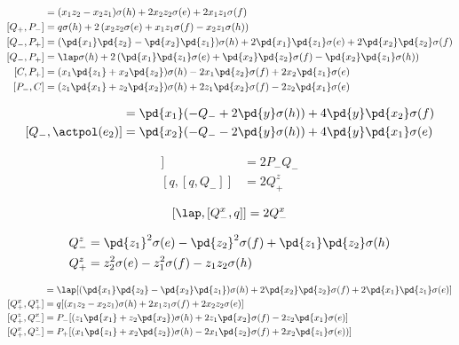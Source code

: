 \begin{align}
[Q_+, P_-] &= (x_1z_2 - x_2z_1)\sigma(h) + 2x_2z_2\sigma(e) + 2x_1z_1\sigma(f)\\
[Q_+, P_-] &= q\sigma(h) + 2\left(x_2z_2\sigma(e) + x_1z_1\sigma(f) -x_2z_1\sigma(h) \right)\\
[Q_-, P_+] &= (\pd{x_1}\pd{z_2} - \pd{x_2}\pd{z_1})\sigma(h) + 2\pd{x_1}\pd{z_1}\sigma(e) + 2\pd{x_2}\pd{z_2}\sigma(f) \\
[Q_-, P_+] &= \lap\sigma(h) + 2\left(\pd{x_1}\pd{z_1}\sigma(e) + \pd{x_2}\pd{z_2}\sigma(f) - \pd{x_2}\pd{z_1} \sigma(h)\right)\\
[C, P_+] &= (x_1\pd{z_1} + x_2 \pd{z_2})\sigma(h) - 2x_1\pd{z_2}\sigma(f) + 2x_2 \pd{z_1} \sigma(e) \\
[P_-, C] &= (z_1\pd{x_1} + z_2 \pd{x_2})\sigma(h) + 2 z_1\pd{x_2}\sigma(f) - 2z_2 \pd{x_1} \sigma(e)
\end{align}

\begin{align}
[Q_-, \actpol(e_1)] & = \pd{x_1}(- Q_- + 2\pd{y}\sigma(h) ) + 4\pd{y}\pd{x_2}\sigma(f) \\
[Q_-, \actpol(e_2)] & = \pd{x_2}( - Q_- -2\pd{y}\sigma(h)) + 4\pd{y}\pd{x_1}\sigma(e)
\end{align}

\begin{align}
 [Q_-, [Q_-, q]] & = 2P_-Q_-\\
 [q, [q, Q_-]] & = 2Q_+^z
\end{align}

\[
 [\lap, [Q_-^x, q]] = 2Q_-^x
\]

\begin{align}
Q_-^z &= \pd{z_1}^2 \sigma(e) - \pd{z_2}^2 \sigma(f) + \pd{z_1}\pd{z_2} \sigma(h) \\
Q_+^z &= z_2^2 \sigma(e) - z_1^2 \sigma(f) - z_1 z_2 \sigma(h)
\end{align}


\begin{align}
[Q_-^x, Q_-^z] & = \lap[(\pd{x_1}\pd{z_2} - \pd{x_2}\pd{z_1}) \sigma(h) + 2\pd{x_2}\pd{z_2}\sigma(f) + 2\pd{x_1}\pd{z_1}\sigma(e)] \\
[Q_+^x, Q_+^z] & = q[(x_1 z_2 - x_2 z_1) \sigma(h) + 2x_1 z_1 \sigma(f) + 2x_2 z_2 \sigma(e)] \\
[Q_+^z, Q_-^x] & = P_-[(z_1\pd{x_1} + z_2 \pd{x_2})\sigma(h) + 2 z_1\pd{x_2}\sigma(f) - 2z_2 \pd{x_1} \sigma(e)] \\
[Q_+^x, Q_-^z] & = P_+[(x_1\pd{z_1} + x_2 \pd{z_2})\sigma(h) - 2x_1\pd{z_2}\sigma(f) + 2x_2 \pd{z_1} \sigma(e))]
\end{align}

